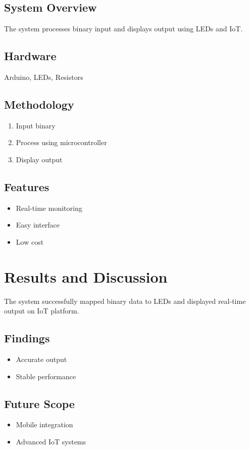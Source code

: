\documentclass[12pt,a4paper,twoside]{report}
\begin{document}
	\section{System Overview}
	The system processes binary input and displays output using LEDs and IoT.
	
	\section{Hardware}
	Arduino, LEDs, Resistors
	
	\section{Methodology}
	\begin{enumerate}
		\item Input binary
		\item Process using microcontroller
		\item Display output
	\end{enumerate}
	
	\section{Features}
	\begin{itemize}
		\item Real-time monitoring
		\item Easy interface
		\item Low cost
	\end{itemize}
	
	\chapter{Results and Discussion}
	
	The system successfully mapped binary data to LEDs and displayed real-time output on IoT platform.
	
	\section{Findings}
	\begin{itemize}
		\item Accurate output
		\item Stable performance
	\end{itemize}
	
	\section{Future Scope}
	\begin{itemize}
		\item Mobile integration
		\item Advanced IoT systems
	\end{itemize}
	
\end{document}
